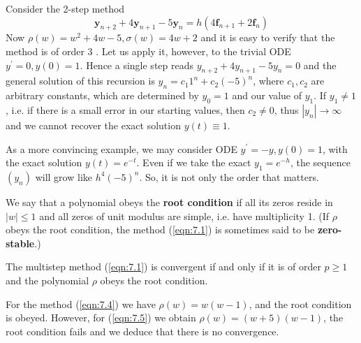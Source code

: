 \documentclass[a4paper]{article}
\begin{document}
\begin{example}
    Consider the 2-step method
\begin{equation}\label{eqn:7.5}
    \mathbf{y}_{n+2}+4 \mathbf{y}_{n+1}-5 \mathbf{y}_n=h\left(4 \mathbf{f}_{n+1}+2 \mathbf{f}_n\right)
\end{equation}
Now $\rho(w)=w^2+4 w-5, \sigma(w)=4 w+2$ and it is easy to verify that the method is of order 3 . Let us apply it, however, to the trivial ODE $y^{\prime}=0, y(0)=1$. Hence a single step reads $y_{n+2}+4 y_{n+1}-5 y_n=0$ and the general solution of this recursion is $y_n=c_1 1^n+c_2(-5)^n$, where $c_1, c_2$ are arbitrary constants, which are determined by $y_0=1$ and our value of $y_1$. If $y_1 \neq 1$, i.e. if there is a small error in our starting values, then $c_2 \neq 0$, thus $\left|y_n\right| \rightarrow \infty$ and we cannot recover the exact solution $y(t) \equiv 1$.

As a more convincing example, we may consider ODE $y^{\prime}=-y, y(0)=1$, with the exact solution $y(t)=e^{-t}$. Even if we take the exact $y_1=e^{-h}$, the sequence $\left(y_n\right)$ will grow like $h^4(-5)^n$. So, it is not only the order that matters.
\end{example}

\begin{definition}
    We say that a polynomial obeys the \textbf{root condition} if all its zeros reside in $|w| \leq 1$ and all zeros of unit modulus are simple, i.e. have multiplicity 1. (If $\rho$ obeys the root condition, the method (\ref{eqn:7.1}) is sometimes said to be \textbf{zero-stable}.)
\end{definition}

\begin{theorem}
    The multistep method (\ref{eqn:7.1}) is convergent if and only if it is of order $p \geq 1$ and the polynomial $\rho$ obeys the root condition.
\end{theorem}

For the method (\ref{eqn:7.4}) we have $\rho(w)=w(w-1)$, and the root condition is obeyed. However, for (\ref{eqn:7.5}) we obtain $\rho(w)=(w+5)(w-1)$, the root condition fails and we deduce that there is no convergence.
\end{document}
